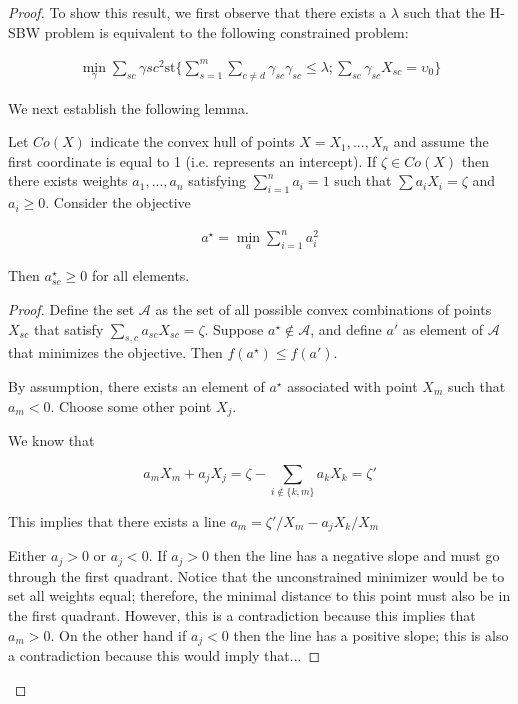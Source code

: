 \begin{proof}

To show this result, we first observe that there exists a $\lambda$ such that the H-SBW problem is equivalent to the following constrained problem:

\begin{align*}
    \min_{\gamma} \sum_{sc}\gamma{sc}^2 \text{st} \{\sum_{s=1}^m\sum_{c\ne d}\gamma_{sc}\gamma_{sc} \le \lambda; \sum_{sc}\gamma_{sc}X_{sc} = \upsilon_0\}
\end{align*}

We next establish the following lemma.

\begin{lemma}
Let $Co(X)$ indicate the convex hull of points $X = X_1, ..., X_n$ and assume the first coordinate is equal to 1 (i.e. represents an intercept). If $\zeta \in Co(X)$ then there exists weights $a_1, ..., a_n$ satisfying $\sum_{i=1}^n a_i = 1$ such that $\sum a_i X_i = \zeta$ and $a_i \ge 0$. Consider the objective

\begin{align*}
a^\star = \min_a \sum_{i=1}^n a_i^2 
\end{align*}

Then $a_{sc}^\star \ge 0$ for all elements.
\end{lemma}

\begin{proof}
Define the set $\mathcal{A}$ as the set of all possible convex combinations of points $X_{sc}$ that satisfy $\sum_{s,c} a_{sc}X_{sc} = \zeta$. Suppose $a^\star \not\in \mathcal{A}$, and define $a'$ as element of $\mathcal{A}$ that minimizes the objective. Then $f(a^\star) \le f(a')$. 

By assumption, there exists an element of $a^\star$ associated with point $X_m$ such that $a_m < 0$. Choose some other point $X_j$. 

We know that 

$$
a_mX_m + a_jX_j = \zeta - \sum_{i \not\in \{k,m\}}a_kX_k = \zeta'
$$

This implies that there exists a line $a_m = \zeta'/X_m - a_jX_k/X_m$

Either $a_j > 0$ or $a_j < 0$. If $a_j > 0$ then the line has a negative slope and must go through the first quadrant. Notice that the unconstrained minimizer would be to set all weights equal; therefore, the minimal distance to this point must also be in the first quadrant. However, this is a contradiction because this implies that $a_m > 0$. On the other hand if $a_j < 0$ then the line has a positive slope; this is also a contradiction because this would imply that... 
\end{proof}


\end{proof}
